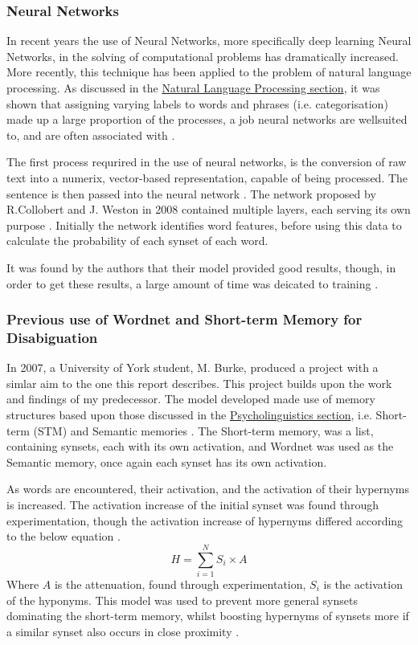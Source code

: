 \documentclass[]{article}
\begin{document}
\subsubsection{Neural Networks}
\label{sec:NeuralNetwork}
In recent years the use of Neural Networks, more specifically deep learning Neural Networks, in the solving of computational problems has dramatically increased. More recently, this technique has been applied to the problem of natural language processing. As discussed in the \hyperref[sec:NLP]{Natural Language Processing section}, it was shown that assigning varying labels to words and phrases (i.e. categorisation) made up a large proportion of the processes, a job neural networks are wellsuited to, and are often associated with \cite{NeuralNetworks}. 

The first process requrired in the use of neural networks, is the conversion of raw text into a numerix, vector-based representation, capable of being processed. The sentence is then passed into the neural network \cite{NeuralNetworks}. The network proposed by R.Collobert and J. Weston in 2008 contained multiple layers, each serving its own purpose \cite{NeuralNetworks}. Initially the network identifies word features, before using this data to calculate the probability of each synset of each word.

It was found by the authors that their model provided good results, though, in order to get these results, a large amount of time was deicated to training \cite{NeuralNetworks}.

\subsubsection{Previous use of Wordnet and Short-term Memory for Disabiguation}
\label{sec:MattBurke}

In 2007, a University of York student, M. Burke, produced a project with a simlar aim to the one this report describes. This project builds upon the work and findings of my predecessor. The model developed made use of memory structures based upon those discussed in the \hyperref[sec:Psycholinguistics]{Psycholinguistics section}, i.e. Short-term (STM) and Semantic memories \cite{MattBurkePrevious}. The Short-term memory, was a list, containing synsets, each with its own activation, and Wordnet was used as the Semantic memory, once again each synset has its own activation.    

As words are encountered, their activation, and the activation of their hypernyms is increased. The activation increase of the initial synset was found through experimentation, though the activation increase of hypernyms differed according to the below equation \cite{MattBurkePrevious}. 
\[H = \sum\limits_{i=1}^N S_i \times A\]
Where \(A\) is the attenuation, found through experimentation, \(S_i\) is the activation of the hyponyms. This model was used to prevent more general synsets dominating the short-term memory, whilst boosting hypernyms of synsets more if a similar synset also occurs in close proximity \cite{MattBurkePrevious}.
\end{document}
